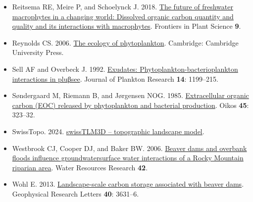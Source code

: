 \documentclass[11pt,a4paper]{article}
\begin{document}
\begin{itemize}
\item[] Reitsema RE, Meire P, and Schoelynck J. 2018. \href{https://doi.org/10.3389/fpls.2018.00629}{The future of freshwater macrophytes in a changing world: Dissolved organic carbon quantity and quality and its interactions with macrophytes}. Frontiers in Plant Science \textbf{9}.
\item[] Reynolds CS. 2006. \href{https://doi.org/10.1017/CBO9780511542145}{The ecology of phytoplankton}. Cambridge: Cambridge University Press.
\item[] Sell AF and Overbeck J. 1992. \href{https://doi.org/10.1093/plankt/14.9.1199}{Exudates: Phytoplankton-bacterioplankton interactions in pluβsee}. Journal of Plankton Research \textbf{14}: 1199--215.
\item[] Søndergaard M, Riemann B, and Jørgensen NOG. 1985. \href{https://doi.org/10.2307/3565567}{Extracellular organic carbon (EOC) released by phytoplankton and bacterial production}. Oikos \textbf{45}: 323--32.
\item[] SwissTopo. 2024. \href{https://www.swisstopo.admin.ch/en/landscape-model-swisstlm3d}{swissTLM3D -- topographic landscape model}.
\item[] Westbrook CJ, Cooper DJ, and Baker BW. 2006. \href{https://doi.org/10.1029/2005WR004560}{Beaver dams and overbank floods influence groundwatersurface water interactions of a Rocky Mountain riparian area}. Water Resources Research \textbf{42}.
\item[] Wohl E. 2013. \href{https://doi.org/10.1002/grl.50710}{Landscape-scale carbon storage associated with beaver dams}. Geophysical Research Letters \textbf{40}: 3631--6.
\end{itemize}
\end{document}
